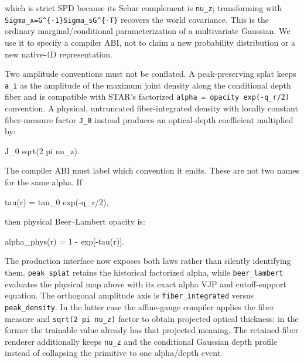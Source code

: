 \documentclass[
]{article}
\newenvironment{Shaded}{}{}
\newcommand{\NormalTok}[1]{#1}
\begin{document}
which is strict SPD because its Schur complement is \texttt{nu\_z};
transforming with \texttt{Sigma\_x=G\^{}\{-1\}Sigma\_sG\^{}\{-T\}}
recovers the world covariance. This is the ordinary marginal/conditional
parameterization of a multivariate Gaussian. We use it to specify a
compiler ABI, not to claim a new probability distribution or a new
native-4D representation.

Two amplitude conventions must not be conflated. A peak-preserving splat
keeps \texttt{a\_i} as the amplitude of the maximum joint density along
the conditional depth fiber and is compatible with STAR's factorized
\texttt{alpha\ =\ opacity\ exp(-q\_r/2)} convention. A physical,
untruncated fiber-integrated density with locally constant fiber-measure
factor \texttt{J\_0} instead produces an optical-depth coefficient
multiplied by:

\begin{Shaded}
\begin{Highlighting}[]
\NormalTok{J\_0 sqrt(2 pi nu\_z).}
\end{Highlighting}
\end{Shaded}

The compiler ABI must label which convention it emits. These are not two
names for the same alpha. If

\begin{Shaded}
\begin{Highlighting}[]
\NormalTok{tau(r) = tau\_0 exp({-}q\_r/2),}
\end{Highlighting}
\end{Shaded}

then physical Beer--Lambert opacity is:

\begin{Shaded}
\begin{Highlighting}[]
\NormalTok{alpha\_phys(r) = 1 {-} exp[{-}tau(r)].}
\end{Highlighting}
\end{Shaded}

The production interface now exposes both laws rather than silently
identifying them. \texttt{peak\_splat} retains the historical factorized
alpha, while \texttt{beer\_lambert} evaluates the physical map above
with its exact alpha VJP and cutoff-support equation. The orthogonal
amplitude axis is \texttt{fiber\_integrated} versus
\texttt{peak\_density}. In the latter case the affine-gauge compiler
applies the fiber measure and \texttt{sqrt(2\ pi\ nu\_z)} factor to
obtain projected optical thickness; in the former the trainable value
already has that projected meaning. The retained-fiber renderer
additionally keeps \texttt{nu\_z} and the conditional Gaussian depth
profile instead of collapsing the primitive to one alpha/depth event.
\end{document}
